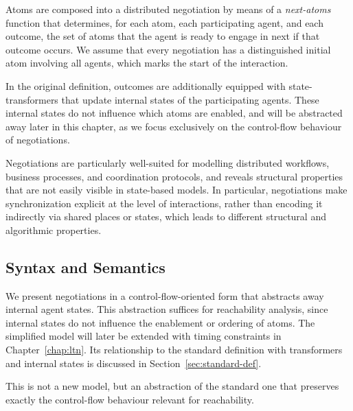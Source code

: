 Atoms are composed into a distributed negotiation by means of a \emph{next-atoms} function that determines, for each atom, each participating agent, and each outcome, the set of atoms that the agent is ready to engage in next if that outcome occurs. We assume that every negotiation has a distinguished initial atom involving all agents, which marks the start of the interaction.

In the original definition, outcomes are additionally equipped with state-transformers that update internal states of the participating agents. These internal states do not influence which atoms are enabled, and will be abstracted away later in this chapter, as we focus exclusively on the control-flow behaviour of negotiations.

Negotiations are particularly well-suited for modelling distributed workflows, business processes, and coordination protocols, and reveals structural properties that are not easily visible in state-based models. In particular, negotiations make synchronization explicit at the level of interactions, rather than encoding it indirectly via shared places or states, which leads to different structural and algorithmic properties.


\subsection{Syntax and Semantics}

We present negotiations in a control-flow-oriented form that abstracts away internal agent states. This abstraction suffices for reachability analysis, since internal states do not influence the enablement or ordering of atoms. The simplified model will later be extended with timing constraints in Chapter~\ref{chap:ltn}. Its relationship to the standard definition with transformers and internal states is discussed in Section~\ref{sec:standard-def}.

This is not a new model, but an abstraction of the standard one that preserves exactly the control-flow behaviour relevant for reachability.

